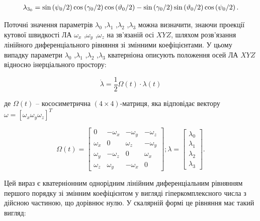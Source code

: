\[\begin{array}{l}
{\lambda_{3_{0} } =\sin  \left({\psi_{0}  \mathord{\left/{\vphantom{
\psi_{0}  2}}\right.\kern-\nulldelimiterspace} 2} \right)\cos  \left({\gamma_{0}  
\mathord{\left/{\vphantom{\gamma_{0}  2}}\right.\kern-\nulldelimiterspace} 2} \right)
\cos  \left({\vartheta_{0}  \mathord{\left/{\vphantom{\vartheta_{0}  2}}\right.
\kern-\nulldelimiterspace} 2} \right)-\sin  \left({\gamma_{0}  \mathord{\left/{
\vphantom{\gamma_{0}  2}}\right.\kern-\nulldelimiterspace} 2} \right)\sin  \left({
\vartheta_{0}  \mathord{\left/{\vphantom{\vartheta_{0}  2}}\right.\kern-\nulldelimiterspace} 
2} \right)\cos  \left({\psi_{0}  \mathord{\left/{\vphantom{\psi_{0}  2}}\right.
\kern-\nulldelimiterspace} 2} \right).} \end{array}\] 

Поточні значення параметрів $\lambda_{0}$ ,$\lambda_{1}$ ,$\lambda_{2}$ ,$\lambda_{3}$ можна 
визначити, знаючи проекції кутової швидкості ЛА $\omega_{x}$ ,$\omega_{y}$ ,$\omega_{z}$ 
на зв'язаній осі $XYZ$, шляхом розв'язання лінійного диференціального рівняння 
зі змінними коефіцієнтами. У цьому випадку параметри $\lambda_{0}$ ,$\lambda_{1}$ 
,$\lambda_{2}$ ,$\lambda_{3}$ кватерніона  описують  положення  осей ЛА  $XYZ$  відносно  
інерціального простору:

\[\dot{\lambda }=\frac{1}{2} \Omega(t)\cdot \lambda(t)\] 
\begin{ESKDexplanation}
\item де $\Omega(t)$ -- кососиметрична $(4\times 4)$-матриця, яка 
відповідає вектору $\omega =[\omega_{x} \omega_{y} \omega_{z}]^{T}  $
\end{ESKDexplanation}
\[\Omega (t)=\left[
\begin{array}{cccc} 
  {0} & {-\omega_{x}} & {-\omega_{y}} & {-\omega_{z}} \\ 
  {\omega_{x}} & {0} & {\omega_{z} } & {-\omega_{y}} \\ 
  {\omega_{y}} & {-\omega_{z}} & {0} & {\omega_{x}} \\ 
  {\omega_{z}} & {\omega_{y}} & {-\omega_{x}} & {0} 
\end{array}\right];
\lambda =\left[\begin{array}{c} 
  {\lambda_{0} } \\ 
  {\lambda_{1} } \\ 
  {\lambda_{2} } \\ 
  {\lambda_{3} } 
\end{array}
\right].\] 

Цей вираз є кватерніонним однорідним лінійним диференціальним рівнянням першого порядку 
зі змінним коефіцієнтом у вигляді гіперкомплексного числа з дійсною частиною, що 
дорівнює нулю. У скалярній формі це рівняння  має такий вигляд:


